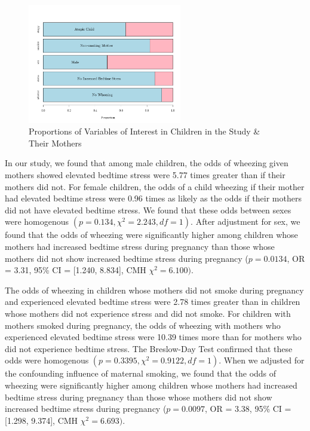 \documentclass{article}
\begin{document}
	
	
	\newpage
	\begin{figure}[h!]
		\centering
		\includegraphics[width=0.6\textwidth]{graphs/stackedBars_case1.png}
		\caption{Proportions of Variables of Interest in Children in the Study \& Their Mothers}
		\label{fig:histogram}
	\end{figure}

	In our study, we found that among male children, the odds of wheezing given mothers showed elevated bedtime stress were 5.77 times greater than if their mothers did not. For female children, the odds of a child wheezing if their mother had elevated bedtime stress were 0.96 times as likely as the odds if their mothers did not have elevated bedtime stress. We found that these odds between sexes were homogenous $(p = 0.134, \chi^2 = 2.243, df = 1)$. After adjustment for sex, we found that the odds of wheezing were significantly higher among children whose mothers had increased bedtime stress during pregnancy than those whose mothers did not show increased bedtime stress during pregnancy ($p = 0.0134$, OR = 3.31, 95\% CI = [1.240, 8.834], CMH $\chi^2 = 6.100)$.


	The odds of wheezing in children whose mothers did not smoke during pregnancy and experienced elevated bedtime stress were 2.78 times greater than in children whose mothers did not experience stress and did not smoke. For children with mothers smoked during pregnancy, the odds of wheezing with mothers who experienced elevated bedtime stress were 10.39 times more than for mothers who did not experience bedtime stress. The Breslow-Day Test confirmed that these odds were homogenous $(p = 0.3395, \chi^2 = 0.9122, df = 1)$. When we adjusted for the confounding influence of maternal smoking, we found that the odds of wheezing were significantly higher among children whose mothers had increased bedtime stress during pregnancy than those whose mothers did not show increased bedtime stress during pregnancy ($p=0.0097$, OR = 3.38, 95\% CI = [1.298, 9.374], CMH $\chi^2 = 6.693)$.
\end{document}
